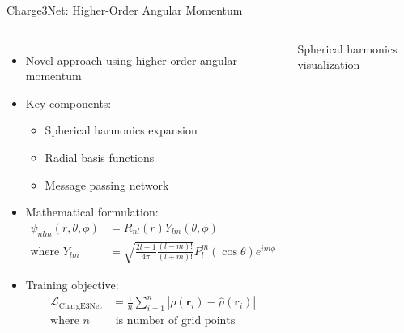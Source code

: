\documentclass[aspectratio=169]{beamer}
\begin{document}
\begin{frame}{Charge3Net: Higher-Order Angular Momentum}
    \begin{columns}
        \begin{itemize}
            \item Novel approach using higher-order angular momentum
            \item Key components:
            \begin{itemize}
                \item Spherical harmonics expansion
                \item Radial basis functions
                \item Message passing network
            \end{itemize}
            \item Mathematical formulation:
            \begin{align*}
                \psi_{nlm}(r,\theta,\phi) &= R_{nl}(r)Y_{lm}(\theta,\phi) \\
                \text{where } Y_{lm} &= \sqrt{\frac{2l+1}{4\pi}\frac{(l-m)!}{(l+m)!}}P_l^m(\cos\theta)e^{im\phi}
            \end{align*}
            \item Training objective:
            \begin{align*}
                \mathcal{L}_{\text{ChargE3Net}} &= \frac{1}{n}\sum_{i=1}^n |\rho(\mathbf{r}_i) - \hat{\rho}(\mathbf{r}_i)| \\
                \text{where } n &\text{ is number of grid points}
            \end{align*}
        \end{itemize}
        Spherical harmonics visualization
    \end{columns}
\end{frame}



\end{document}
